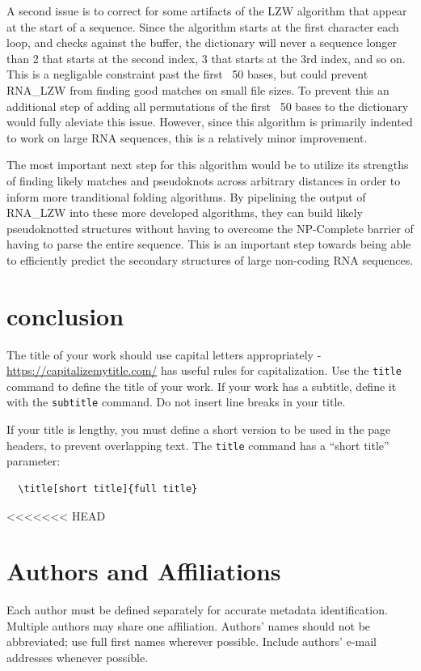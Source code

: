 \documentclass[sigconf]{acmart}
\begin{document}
A second issue is to correct for some artifacts of the LZW algorithm that appear at the start of a sequence. Since the algorithm starts at the first character each loop, and checks against the buffer, the dictionary will never a sequence longer than 2 that starts at the second index, 3 that starts at the 3rd index, and so on. This is a negligable constraint past the first ~50 bases, but could prevent RNA\_LZW from finding good matches on small file sizes. To prevent this an additional step of adding all permutations of the first ~50 bases to the dictionary would fully aleviate this issue. However, since this algorithm is primarily indented to work on large RNA sequences, this is a relatively minor improvement.

The most important next step for this algorithm would be to utilize its strengths of finding likely matches and pseudoknots across arbitrary distances in order to inform more tranditional folding algorithms. By pipelining the output of RNA\_LZW into these more developed algorithms, they can build likely pseudoknotted structures without having to overcome the NP-Complete barrier of having to parse the entire sequence. This is an important step towards being able to efficiently predict the secondary structures of large non-coding RNA sequences. 



\section{conclusion}

The title of your work should use capital letters appropriately -
\url{https://capitalizemytitle.com/} has useful rules for
capitalization. Use the {\verb|title|} command to define the title of
your work. If your work has a subtitle, define it with the
{\verb|subtitle|} command.  Do not insert line breaks in your title.

If your title is lengthy, you must define a short version to be used
in the page headers, to prevent overlapping text. The \verb|title|
command has a ``short title'' parameter:
\begin{verbatim}
  \title[short title]{full title}
\end{verbatim}

<<<<<<< HEAD
\section{Authors and Affiliations}

Each author must be defined separately for accurate metadata
identification. Multiple authors may share one affiliation. Authors'
names should not be abbreviated; use full first names wherever
possible. Include authors' e-mail addresses whenever possible.
\end{document}
